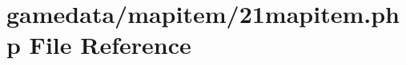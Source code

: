 \hypertarget{21mapitem_8php}{\section{gamedata/mapitem/21mapitem.php File Reference}
\label{21mapitem_8php}
}
